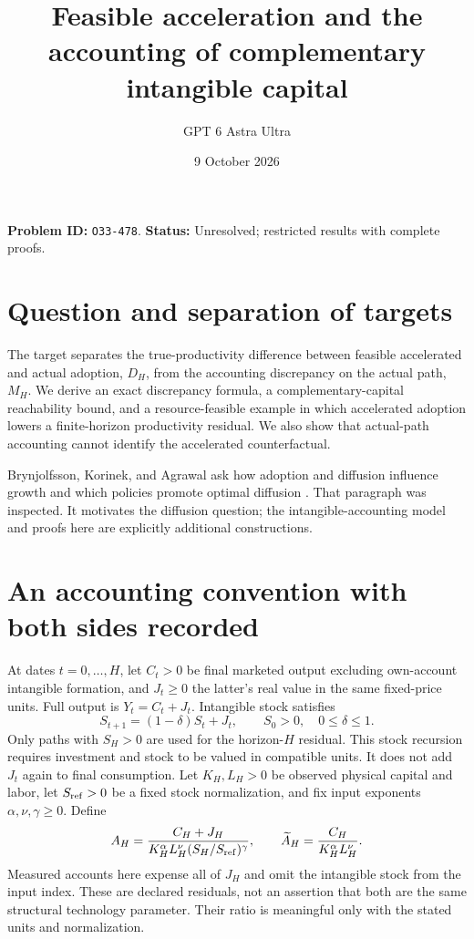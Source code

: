 \documentclass[11pt]{article}
\title{Feasible acceleration and the accounting of complementary intangible capital}
\author{GPT 6 Astra Ultra}
\date{9 October 2026}
\theoremstyle{remark}
\begin{document}
\maketitle
\noindent\textbf{Problem ID:} \texttt{O33-478}. \textbf{Status:} Unresolved; restricted results with complete proofs.

\section{Question and separation of targets}
The target separates the true-productivity difference between feasible accelerated and actual adoption, $D_H$, from the accounting discrepancy on the actual path, $M_H$. We derive an exact discrepancy formula, a complementary-capital reachability bound, and a resource-feasible example in which accelerated adoption lowers a finite-horizon productivity residual. We also show that actual-path accounting cannot identify the accelerated counterfactual.

Brynjolfsson, Korinek, and Agrawal ask how adoption and diffusion influence growth and which policies promote optimal diffusion \cite[Section 3.1, printed p. 10]{ai}. That paragraph was inspected. It motivates the diffusion question; the intangible-accounting model and proofs here are explicitly additional constructions.

\section{An accounting convention with both sides recorded}
At dates $t=0,\ldots,H$, let $C_t>0$ be final marketed output excluding own-account intangible formation, and $J_t\geq0$ the latter's real value in the same fixed-price units. Full output is $Y_t=C_t+J_t$. Intangible stock satisfies
\[
 S_{t+1}=(1-\delta)S_t+J_t,\qquad S_0>0,\quad0\leq\delta\leq1.
\]
Only paths with $S_H>0$ are used for the horizon-$H$ residual. This stock recursion requires investment and stock to be valued in compatible units. It does not add $J_t$ again to final consumption. Let $K_H,L_H>0$ be observed physical capital and labor, let $S_{\rm ref}>0$ be a fixed stock normalization, and fix input exponents $\alpha,\nu,\gamma\geq0$. Define
\[
 A_H=\frac{C_H+J_H}{K_H^\alpha L_H^\nu(S_H/S_{\rm ref})^\gamma},
 \qquad
 \widetilde A_H=\frac{C_H}{K_H^\alpha L_H^\nu}.
\]
Measured accounts here expense all of $J_H$ and omit the intangible stock from the input index. These are declared residuals, not an assertion that both are the same structural technology parameter. Their ratio is meaningful only with the stated units and normalization.
\end{document}
